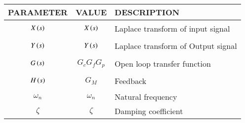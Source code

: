 \begin{tabular}{|p{2cm}|p{2cm}|p{4cm}|}
    \hline
    PARAMETER & VALUE & DESCRIPTION   \\ \hline
    $$X\left(s\right)$$ & $$X\left(s\right)$$ & Laplace transform of input signal  \\ \hline
    $$Y\left(s\right)$$ & $$Y\left(s\right)$$ & Laplace transform of Output signal  \\ \hline
    $$G\left(s\right)$$ & $$G_c G_f G_p$$ & Open loop transfer function    \\ \hline
    $$H\left(s\right)$$ & $$G_M$$ & Feedback  \\ \hline
    $$\omega _n$$ & $$\omega _n$$ & Natural frequency   \\ \hline
    $$\zeta$$ & $$\zeta$$ & Damping coefficient   \\ \hline
    \end{tabular}
